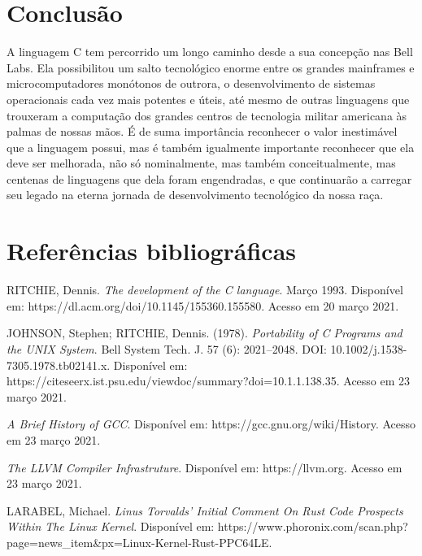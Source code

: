 \documentclass[
	12pt,				%
	openright,			%
	twoside,			%
	a4paper,			%
	english,			%
	french,				%
	spanish,			%
	brazil				%
	]{abntex2}
\begin{document}
\chapter{Conclusão}

A linguagem C tem percorrido um longo caminho desde a sua concepção nas Bell Labs. Ela possibilitou um salto tecnológico enorme entre os grandes mainframes e microcomputadores monótonos de outrora, o desenvolvimento de sistemas operacionais cada vez mais potentes e úteis, até mesmo de outras linguagens que trouxeram a computação dos grandes centros de tecnologia militar americana às palmas de nossas mãos. É de suma importância reconhecer o valor inestimável que a linguagem possui, mas é também igualmente importante reconhecer que ela deve ser melhorada, não só nominalmente, mas também conceitualmente, mas centenas de linguagens que dela foram engendradas, e que continuarão a carregar seu legado na eterna jornada de desenvolvimento tecnológico da nossa raça. \par

\chapter{Referências bibliográficas}

RITCHIE, Dennis. \textit{The development of the C language}. Março 1993. Disponível em: https://dl.acm.org/doi/10.1145/155360.155580. Acesso em 20 março 2021.

JOHNSON, Stephen; RITCHIE, Dennis. (1978). \textit{Portability of C Programs and the UNIX System}. Bell System Tech. J. 57 (6): 2021–2048. DOI: 10.1002/j.1538-7305.1978.tb02141.x. Disponível em: https://citeseerx.ist.psu.edu/viewdoc/summary?doi=10.1.1.138.35. Acesso em 23 março 2021.

\textit{A Brief History of GCC}. Disponível em: https://gcc.gnu.org/wiki/History. Acesso em 23 março 2021.

\textit{The LLVM Compiler Infrastruture}. Disponível em: https://llvm.org. Acesso em 23 março 2021.

LARABEL, Michael. \textit{Linus Torvalds' Initial Comment On Rust Code Prospects Within The Linux Kernel}. Disponível em: https://www.phoronix.com/scan.php?page=news_item&px=Linux-Kernel-Rust-PPC64LE.
\end{document}
